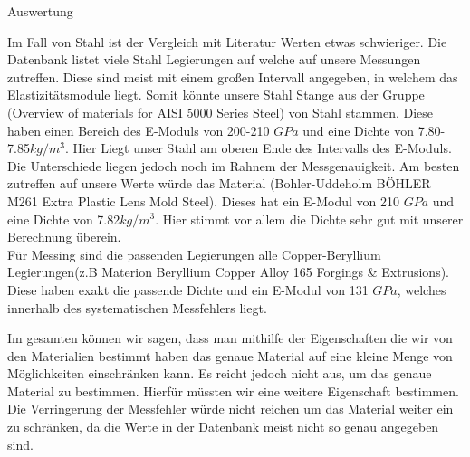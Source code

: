 \documentclass[twoside]{protokoll}
\begin{document}
\begin{aufgabe}{Auswertung}
 
Im Fall von Stahl ist der Vergleich mit Literatur Werten etwas schwieriger. 
Die Datenbank listet viele Stahl Legierungen auf welche auf unsere Messungen zutreffen.
Diese sind meist mit einem großen Intervall angegeben, in welchem das Elastizitätsmodule liegt.
Somit könnte unsere Stahl Stange aus der Gruppe (Overview of materials for AISI 5000 Series Steel) von Stahl stammen. Diese haben einen Bereich des E-Moduls von 200-210 $GPa$ und eine Dichte von 7.80-7.85$kg/m^3$. Hier Liegt unser Stahl am oberen Ende des Intervalls des E-Moduls. Die Unterschiede liegen jedoch noch im Rahnem der Messgenauigkeit. 
Am besten zutreffen auf unsere Werte würde das Material (Bohler-Uddeholm BÖHLER M261 Extra Plastic Lens Mold Steel). Dieses hat ein E-Modul von 210 $GPa$ und eine Dichte von
7.82$kg/m^3$. Hier stimmt vor allem die Dichte sehr gut mit unserer Berechnung überein.\\
 
Für Messing sind die passenden Legierungen alle Copper-Beryllium Legierungen(z.B Materion Beryllium Copper Alloy 165 Forgings \& Extrusions).
Diese haben exakt die passende Dichte und ein E-Modul von 131 $GPa$, welches innerhalb des systematischen Messfehlers liegt.
 
Im gesamten können wir sagen, dass man mithilfe der Eigenschaften die wir von den Materialien bestimmt haben das genaue Material auf eine kleine Menge von Möglichkeiten einschränken kann. 
Es reicht jedoch nicht aus, um das genaue Material zu bestimmen. Hierfür müssten wir 
eine weitere Eigenschaft bestimmen. Die Verringerung der Messfehler würde nicht reichen
um das Material weiter ein zu schränken, da die Werte in der Datenbank meist nicht so genau angegeben sind. 
\end{aufgabe}



\end{document}

